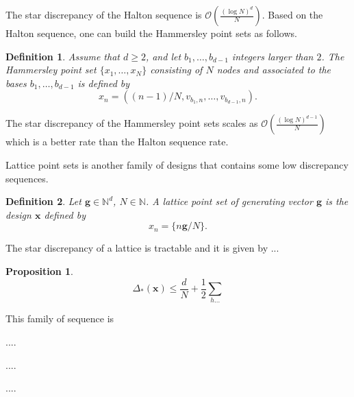 \documentclass[twoside,11pt]{book}
\newtheorem{proposition}{Proposition}
\newtheorem{definition}{Definition}
\begin{document}
The star discrepancy of the Halton sequence is $\displaystyle \mathcal{O}(\frac{(\log N)^{d}}{N})$. Based on the Halton sequence, one can build the Hammersley point sets as follows. 
\begin{definition}
Assume that $d \geq 2$, and let $b_{1}, \dots, b_{d-1}$ integers larger than $2$.
The Hammersley point set $\{x_{1}, \dots, x_{N} \}$ consisting of $N$ nodes and associated to the bases $b_{1}, \dots, b_{d-1}$ is defined by
\begin{equation}
x_{n} = ((n-1)/N,v_{b_1,n}, \dots, v_{b_{d-1},n}).
\end{equation}
\end{definition}




The star discrepancy of the Hammersley point sets scales as $\displaystyle \mathcal{O}(\frac{(\log N)^{d-1}}{N})$ which is a better rate than the Halton sequence rate.


Lattice point sets is another family of designs that contains some low discrepancy sequences.

\begin{definition}
Let $\bm{g} \in \mathbb{N}^{d}$, $N \in \mathbb{N}$. A lattice point set of generating vector $\bm{g}$ is the design $\bm{x}$ defined by
\begin{equation}
x_{n} = \{ n\bm{g}/N \}.
\end{equation}
\end{definition}

The star discrepancy of a lattice is tractable and it is given by ...

\begin{proposition}
\begin{equation}
\Delta_{*}(\bm{x}) \leq \frac{d}{N} + \frac{1}{2} \sum\limits_{h ...}
\end{equation}
\end{proposition}

This family of sequence is 


....


....

....
\end{document}
